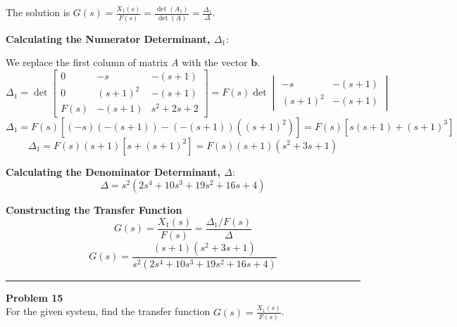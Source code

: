 \documentclass[11pt]{article}
\begin{document}
The solution is $G(s) = \frac{X_1(s)}{F(s)} = \frac{\det(A_1)}{\det(A)} = \frac{\Delta_1}{\Delta}$.

\vspace{12pt}
\noindent\textbf{Calculating the Numerator Determinant, $\Delta_1$}:
\vspace{12pt}

We replace the first column of matrix $A$ with the vector $\mathbf{b}$.
$$ \Delta_1 = \det
\begin{bmatrix}
0 & -s & -(s + 1) \\
0 & (s+1)^2 & -(s + 1) \\
F(s) & -(s+1) & s^2 + 2s + 2
\end{bmatrix}
= F(s) \det \begin{vmatrix} -s & -(s+1) \\ (s+1)^2 & -(s+1) \end{vmatrix} $$
$$ \Delta_1 = F(s) [(-s)(-(s+1)) - (-(s+1))((s+1)^2)] = F(s)[s(s+1) + (s+1)^3] $$
$$ \Delta_1 = F(s)(s+1)[s + (s+1)^2] = F(s)(s+1)(s^2+3s+1) $$

\vspace{12pt}
\noindent\textbf{Calculating the Denominator Determinant, $\Delta$}:
$$ \Delta = s^2(2s^4 + 10s^3 + 19s^2 + 16s + 4) $$

\vspace{12pt}
\noindent\textbf{Constructing the Transfer Function}
$$G(s) = \frac{X_1(s)}{F(s)} = \frac{\Delta_1 / F(s)}{\Delta}$$
\[
\boxed{
G(s) = \frac{(s+1)(s^2+3s+1)}{s^2(2s^4 + 10s^3 + 19s^2 + 16s + 4)}
}
\]

\newpage
  \setcounter{page}{28}  
\noindent\rule{\textwidth}{1pt}
\noindent\textbf{Problem 15} \hfill 
\\ For the given system, find the transfer function $G(s)=\frac{X_1(s)}{F(s)}$.
\end{document}
